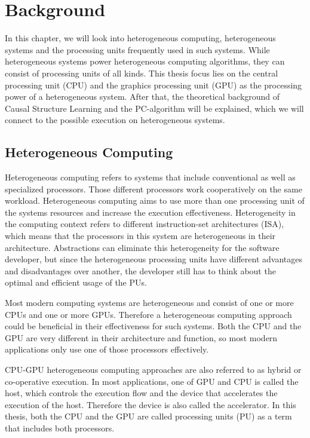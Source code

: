 \chapter{Background}
In this chapter, we will look into heterogeneous computing, heterogeneous systems and the processing units frequently used in such systems. While heterogeneous systems power heterogeneous computing algorithms, they can consist of processing units of all kinds. This thesis focus lies on the central processing unit (CPU) and the graphics processing unit (GPU) as the processing power of a heterogeneous system.
After that, the theoretical background of Causal Structure Learning and the PC-algorithm will be explained, which we will connect to the possible execution on heterogeneous systems.

\section{Heterogeneous Computing}
Heterogeneous computing refers to systems that include conventional as well as specialized processors. Those different processors work cooperatively on the same workload. \cite{shan_heterogeneous_2006} Heterogeneous computing aims to use more than one processing unit of the systems resources and increase the execution effectiveness. Heterogeneity in the computing context refers to different instruction-set architectures (ISA), which means that the processors in this system are heterogeneous in their architecture.
Abstractions can eliminate this heterogeneity for the software developer, but since the heterogeneous processing units have different advantages and disadvantages over another, the developer still has to think about the optimal and efficient usage of the PUs.

Most modern computing systems are heterogeneous and consist of one or more CPUs and one or more GPUs. Therefore a heterogeneous computing approach could be beneficial in their effectiveness for such systems. Both the CPU and the GPU are very different in their architecture and function, so most modern applications only use one of those processors effectively.

CPU-GPU heterogeneous computing approaches are also referred to as hybrid or co-operative execution. In most applications, one of GPU and CPU is called the host, which controls the execution flow and the device that accelerates the execution of the host. Therefore the device is also called the accelerator. In this thesis, both the CPU and the GPU are called processing units (PU) as a term that includes both processors.

